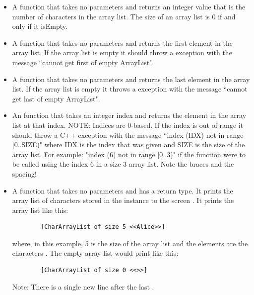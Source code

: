 \documentclass[11pt]{report}
\begin{document}
\begin{itemize}
    \item A  function that takes no parameters and returns an integer
      value that is the number of characters in the array list.  The
      size of an array list is 0 if and only if it isEmpty.
     
     \item A  function that takes no parameters and returns the first
      element  in the array list.  If the array list is empty it
      should throw a  exception with the message
      ``cannot get first of empty ArrayList".

    \item A  function that takes no parameters and returns the last
      element  in the array list.  If the array list is empty it
      throws a  exception with the message ``cannot
      get last of empty ArrayList".

    \item An  function that takes an integer index and returns
      the element  in the array list at that index.  NOTE: Indices
      are 0-based.  If the index is out of range it should throw a C++
       exception with the message ``index (IDX) not in range
      [0..SIZE)" where IDX is the index that was given and SIZE is the
      size of the array list. For example: "index (6) not in range
      [0..3)" if the function were to be called using the index 6 in a
      size 3 array list. Note the braces and the spacing!


    \item A  function that takes no parameters and has a  return
      type.  It prints the array list of characters stored in the
      instance to the screen .  It prints the array list like this:
    \begin{lstlisting}
        [CharArrayList of size 5 <<Alice>>]
    \end{lstlisting}

      where, in this example, 5 is the size of the array list and the
      elements are the characters .  The
      empty array list would print like this:
    
    \begin{lstlisting}
        [CharArrayList of size 0 <<>>]
    \end{lstlisting}

      Note: There is a single new line after the last \code{]}.  


\end{itemize}
\end{document}
